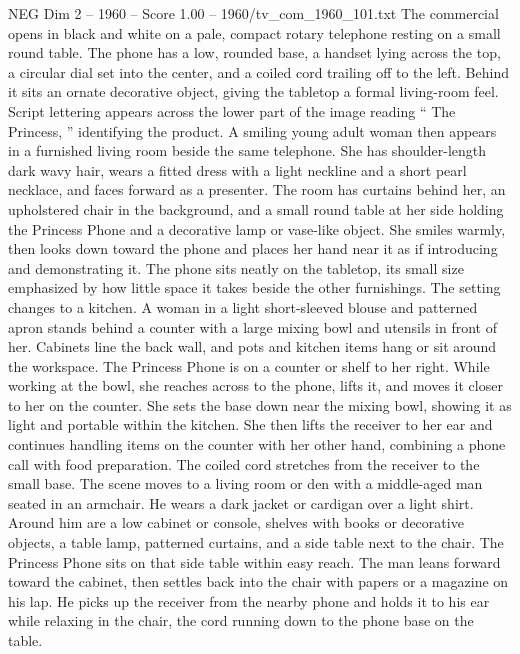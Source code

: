 \begin{textsample}{NEG Dim 2 – 1960 – Score 1.00 – 1960/tv\_com\_1960\_101.txt}  \label{ex:f2_neg_084}
The commercial opens in black and white on a pale, compact rotary telephone resting on a small round table.
The phone has a low, rounded base, a handset lying across the top, a circular dial set into the center, and a coiled cord trailing off to the left.
Behind it sits an ornate decorative object, giving the tabletop a formal living-room feel.
Script lettering appears across the lower part of the image reading “ The Princess, ” identifying the product.
A smiling young adult woman then appears in a furnished living room beside the same telephone.
She has shoulder-length dark wavy hair, wears a fitted dress with a light neckline and a short pearl necklace, and faces forward as a presenter.
The room has curtains behind her, an upholstered chair in the background, and a small round table at her side holding the Princess Phone and a decorative lamp or vase-like object.
She smiles warmly, then looks down toward the phone and places her hand near it as if introducing and demonstrating it.
The phone sits neatly on the tabletop, its small size emphasized by how little space it takes beside the other furnishings.
The setting changes to a kitchen.
A woman in a light short-sleeved blouse and patterned apron stands behind a counter with a large mixing bowl and utensils in front of her.
Cabinets line the back wall, and pots and kitchen items hang or sit around the workspace.
The Princess Phone is on a counter or shelf to her right.
While working at the bowl, she reaches across to the phone, lifts it, and moves it closer to her on the counter.
She sets the base down near the mixing bowl, showing it as light and portable within the kitchen.
She then lifts the receiver to her ear and continues handling items on the counter with her other hand, combining a phone call with food preparation.
The coiled cord stretches from the receiver to the small base.
The scene moves to a living room or den with a middle-aged man seated in an armchair.
He wears a dark jacket or cardigan over a light shirt.
Around him are a low cabinet or console, shelves with books or decorative objects, a table lamp, patterned curtains, and a side table next to the chair.
The Princess Phone sits on that side table within easy reach.
The man leans forward toward the cabinet, then settles back into the chair with papers or a magazine on his lap.
He picks up the receiver from the nearby phone and holds it to his ear while relaxing in the chair, the cord running down to the phone base on the table.

\end{textsample}
